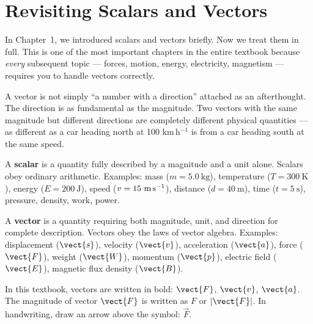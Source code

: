\vspace{0.5cm}

\section{Revisiting Scalars and Vectors}

In Chapter~1, we introduced scalars and vectors briefly.
Now we treat them in full. This is one of the most important
chapters in the entire textbook because \textit{every}
subsequent topic --- forces, motion, energy, electricity,
magnetism --- requires you to handle vectors correctly.

A vector is not simply ``a number with a direction''
attached as an afterthought. The direction is as
fundamental as the magnitude. Two vectors with the same
magnitude but different directions are completely different
physical quantities --- as different as a car heading north
at 100 km\,h$^{-1}$ is from a car heading south at the
same speed.

\begin{definitionbox}[Scalar]
A \textbf{scalar} is a quantity fully described by a
magnitude and a unit alone. Scalars obey ordinary
arithmetic. Examples: mass ($m = 5.0\ \text{kg}$),
temperature ($T = 300\ \text{K}$), energy
($E = 200\ \text{J}$), speed ($v = 15\ \text{m\,s}^{-1}$),
distance ($d = 40\ \text{m}$), time ($t = 5\ \text{s}$),
pressure, density, work, power.
\end{definitionbox}

\begin{definitionbox}[Vector]
A \textbf{vector} is a quantity requiring both magnitude,
unit, and direction for complete description. Vectors obey
the laws of vector algebra. Examples: displacement
($\vect{s}$), velocity ($\vect{v}$), acceleration
($\vect{a}$), force ($\vect{F}$), weight ($\vect{W}$),
momentum ($\vect{p}$), electric field ($\vect{E}$),
magnetic flux density ($\vect{B}$).
\end{definitionbox}

\begin{keybox}[Notation]
In this textbook, vectors are written in bold:
$\vect{F}$, $\vect{v}$, $\vect{a}$.
The magnitude of vector $\vect{F}$ is written as $F$
or $|\vect{F}|$. In handwriting, draw an arrow above
the symbol: $\vec{F}$.
\end{keybox}

